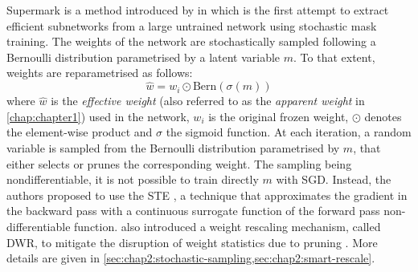 Supermark is a method introduced by \citeauthor{DBLP:conf/nips/ZhouLLY19} in
\cite{DBLP:conf/nips/ZhouLLY19} which is the first attempt to extract efficient
subnetworks from a large untrained network using stochastic mask training. The
weights of the network are stochastically sampled following a Bernoulli
distribution parametrised by a latent variable $m$. To that extent, weights are
reparametrised as follows:
\begin{equation}
  \label{eqn:chap2:sigmoid_reparam}
  \hat{w} = w_i \odot \text{Bern}(\sigma(m))
\end{equation}
where $\hat{w}$ is the \emph{effective weight} (also referred to as the
\emph{apparent weight} in \cref{chap:chapter1}) used in the network, $w_i$ is
the original frozen weight, $\odot$ denotes the element-wise product and
$\sigma$ the sigmoid function. At each iteration, a random variable is sampled
from the Bernoulli distribution parametrised by $m$, that either selects or
prunes the corresponding weight. The sampling being nondifferentiable, it is not
possible to train directly $m$ with \ac{SGD}. Instead, the authors proposed to
use the \ac{STE} \cite{DBLP:journals/corr/BengioLC13}, a technique that
approximates the gradient in the backward pass with a continuous surrogate
function of the forward pass non-differentiable function.
\citeauthor{DBLP:conf/nips/ZhouLLY19} also introduced a weight rescaling
mechanism, called \ac{DWR}, to mitigate the disruption of weight statistics due
to pruning \cite{DBLP:conf/iccv/HeZRS15}. More details are given in
\cref{sec:chap2:stochastic-sampling,sec:chap2:smart-rescale}.\\


